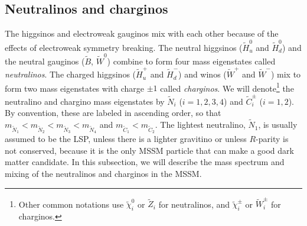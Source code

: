 \documentclass[12pt]{article}
\def\stilde{\widetilde}
\begin{document}
\subsection{Neutralinos and charginos}\label{subsec:MSSMspectrum.inos}
\setcounter{equation}{0}
\setcounter{footnote}{1}

The higgsinos and electroweak gauginos mix with each other because of the 
effects of electroweak symmetry breaking. The neutral higgsinos ($\stilde 
H_u^0$ and $\stilde H_d^0$) and the neutral gauginos ($\stilde B$, 
$\stilde W^0$) combine to form four mass eigenstates called {\it 
neutralinos}. The charged higgsinos ($\stilde H_u^+$ and $\stilde H_d^-$) 
and winos ($\stilde W^+$ and $\stilde W^-$) mix to form two mass 
eigenstates with charge $\pm 1$ called {\it charginos}. We will 
denote\footnote{Other common notations use $\stilde \chi_i^0$ or $\stilde 
Z_i$ for neutralinos, and $\stilde \chi^\pm_i$ or $\stilde W^\pm_i$ for 
charginos.} the neutralino and chargino mass eigenstates by $\stilde N_i$ 
($i=1,2,3,4$) and $\stilde C^\pm_i$ ($i=1,2$). By convention, these are 
labeled in ascending order, so that $m_{\stilde N_1} < m_{\stilde N_2} 
<m_{\stilde N_3} <m_{\stilde N_4}$ and $m_{\stilde C_1} < m_{\stilde 
C_2}$. The lightest neutralino, $\stilde N_1$, is usually assumed to be 
the LSP, unless there is a lighter gravitino or unless $R$-parity is not 
conserved, because it is the only MSSM particle that can make a good dark 
matter candidate. In this subsection, we will describe the mass spectrum 
and mixing of the neutralinos and charginos in the MSSM.
\end{document}
